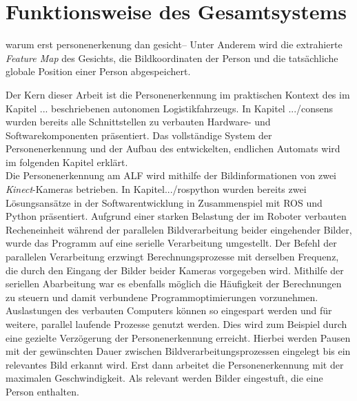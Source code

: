 	
	
	
	 
	
	\section{Funktionsweise des Gesamtsystems}
	\label{sec: Funktionsweise des Gesamtsystems}
	
	warum erst personenerkenung dan gesicht-- Unter Anderem wird die extrahierte \textit{Feature Map} des Gesichts, die Bildkoordinaten der Person und die tatsächliche globale Position einer Person abgespeichert.
	
	Der Kern dieser Arbeit ist die Personenerkennung im praktischen Kontext des im Kapitel ... beschriebenen autonomen Logistikfahrzeugs. In Kapitel .../consens wurden bereits alle Schnittstellen zu verbauten Hardware- und Softwarekomponenten präsentiert. Das vollständige System der Personenerkennung und der Aufbau des entwickelten, endlichen Automats wird im folgenden Kapitel erklärt.\\
	
	Die Personenerkennung am ALF wird mithilfe der Bildinformationen von zwei \textit{Kinect}-Kameras betrieben. In Kapitel.../rospython wurden bereits zwei Lösungsansätze in der Softwarentwicklung in Zusammenspiel mit ROS und Python präsentiert. Aufgrund einer starken Belastung der im Roboter verbauten Recheneinheit während der parallelen Bildverarbeitung beider eingehender Bilder, wurde das Programm auf eine serielle Verarbeitung umgestellt. Der Befehl der parallelen Verarbeitung erzwingt Berechnungsprozesse mit derselben Frequenz, die durch den Eingang der Bilder beider Kameras vorgegeben wird. Mithilfe der seriellen Abarbeitung  war es ebenfalls möglich die Häufigkeit der Berechnungen zu steuern und damit verbundene Programmoptimierungen vorzunehmen. Auslastungen des verbauten Computers können so eingespart werden und für weitere, parallel laufende Prozesse genutzt werden. Dies wird zum Beispiel durch eine gezielte Verzögerung der Personenerkennung erreicht. Hierbei werden Pausen mit der gewünschten Dauer zwischen Bildverarbeitungsprozessen eingelegt bis ein relevantes Bild erkannt wird. Erst dann arbeitet die Personenerkennung mit der maximalen Geschwindigkeit. Als relevant werden Bilder eingestuft, die eine Person enthalten.\\
	
